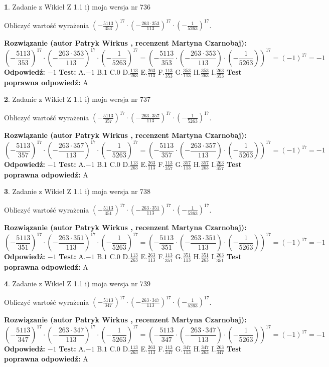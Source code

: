 \documentclass[12pt, a4paper]{article}
\theoremstyle{definition} %
\newtheorem{zad}{}
\newcommand{\zadStart}[1]{\begin{zad}#1\newline}
\newcommand{\zadStop}{\end{zad}}
\newcommand{\rozwStart}[2]{\noindent \textbf{Rozwiązanie (autor #1 , recenzent #2): }\newline}
\newcommand{\rozwStop}{\newline}
\newcommand{\odpStart}{\noindent \textbf{Odpowiedź:}\newline}
\newcommand{\odpStop}{\newline}
\newcommand{\testStart}{\noindent \textbf{Test:}\newline}
\newcommand{\testStop}{\newline}
\newcommand{\kluczStart}{\noindent \textbf{Test poprawna odpowiedź:}\newline}
\newcommand{\kluczStop}{\newline}
\begin{document}
\zadStart{Zadanie z Wikieł Z 1.1 i) moja wersja nr 736}

Obliczyć wartość wyrażenia $(-\frac{5113}{353})^{17} \cdot (-\frac{263 \cdot 353}{113})^{17} \cdot (-\frac{1}{5263})^{17}$.
\zadStop
\rozwStart{Patryk Wirkus}{Martyna Czarnobaj}
$$(-\frac{5113}{353})^{17} \cdot (-\frac{263 \cdot 353}{113})^{17} \cdot (-\frac{1}{5263})^{17} = (-\frac{5113}{353} \cdot (-\frac{263 \cdot 353}{113}) \cdot (-\frac{1}{5263}))^{17} = (-1)^{17} = -1$$
\rozwStop
\odpStart
$-1$
\odpStop
\testStart
A.$-1$ B.$1$ C.$0$ D.$\frac{113}{263}$ E.$\frac{263}{113}$
F.$\frac{113}{353}$ G.$\frac{353}{113}$
H.$\frac{353}{263}$
I.$\frac{263}{353}$
\testStop
\kluczStart
A
\kluczStop



\zadStart{Zadanie z Wikieł Z 1.1 i) moja wersja nr 737}

Obliczyć wartość wyrażenia $(-\frac{5113}{357})^{17} \cdot (-\frac{263 \cdot 357}{113})^{17} \cdot (-\frac{1}{5263})^{17}$.
\zadStop
\rozwStart{Patryk Wirkus}{Martyna Czarnobaj}
$$(-\frac{5113}{357})^{17} \cdot (-\frac{263 \cdot 357}{113})^{17} \cdot (-\frac{1}{5263})^{17} = (-\frac{5113}{357} \cdot (-\frac{263 \cdot 357}{113}) \cdot (-\frac{1}{5263}))^{17} = (-1)^{17} = -1$$
\rozwStop
\odpStart
$-1$
\odpStop
\testStart
A.$-1$ B.$1$ C.$0$ D.$\frac{113}{263}$ E.$\frac{263}{113}$
F.$\frac{113}{357}$ G.$\frac{357}{113}$
H.$\frac{357}{263}$
I.$\frac{263}{357}$
\testStop
\kluczStart
A
\kluczStop



\zadStart{Zadanie z Wikieł Z 1.1 i) moja wersja nr 738}

Obliczyć wartość wyrażenia $(-\frac{5113}{351})^{17} \cdot (-\frac{263 \cdot 351}{113})^{17} \cdot (-\frac{1}{5263})^{17}$.
\zadStop
\rozwStart{Patryk Wirkus}{Martyna Czarnobaj}
$$(-\frac{5113}{351})^{17} \cdot (-\frac{263 \cdot 351}{113})^{17} \cdot (-\frac{1}{5263})^{17} = (-\frac{5113}{351} \cdot (-\frac{263 \cdot 351}{113}) \cdot (-\frac{1}{5263}))^{17} = (-1)^{17} = -1$$
\rozwStop
\odpStart
$-1$
\odpStop
\testStart
A.$-1$ B.$1$ C.$0$ D.$\frac{113}{263}$ E.$\frac{263}{113}$
F.$\frac{113}{351}$ G.$\frac{351}{113}$
H.$\frac{351}{263}$
I.$\frac{263}{351}$
\testStop
\kluczStart
A
\kluczStop



\zadStart{Zadanie z Wikieł Z 1.1 i) moja wersja nr 739}

Obliczyć wartość wyrażenia $(-\frac{5113}{347})^{17} \cdot (-\frac{263 \cdot 347}{113})^{17} \cdot (-\frac{1}{5263})^{17}$.
\zadStop
\rozwStart{Patryk Wirkus}{Martyna Czarnobaj}
$$(-\frac{5113}{347})^{17} \cdot (-\frac{263 \cdot 347}{113})^{17} \cdot (-\frac{1}{5263})^{17} = (-\frac{5113}{347} \cdot (-\frac{263 \cdot 347}{113}) \cdot (-\frac{1}{5263}))^{17} = (-1)^{17} = -1$$
\rozwStop
\odpStart
$-1$
\odpStop
\testStart
A.$-1$ B.$1$ C.$0$ D.$\frac{113}{263}$ E.$\frac{263}{113}$
F.$\frac{113}{347}$ G.$\frac{347}{113}$
H.$\frac{347}{263}$
I.$\frac{263}{347}$
\testStop
\kluczStart
A
\kluczStop
\end{document}
